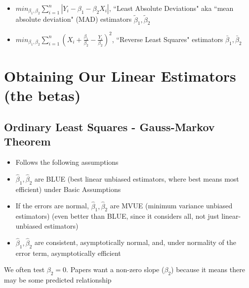 \documentclass[10pt, oneside]{article}
\begin{document}
\begin{itemize}
\begin{itemize}
        \item $min_{\beta_1, \beta_2} \sum ^n _{i=1} |Y_i - \beta_1 -\beta_2 X_i|$, ``Least Absolute Deviations" aka ``mean absolute deviation" (MAD) estimators $\tilde \beta_1, \tilde \beta_2$
        \item $min_{\beta_1, \beta_2} \sum ^n _{i=1} (X_i + \frac{\beta_1}{\beta_2} - \frac{Y_i}{\beta_2})^2$, ``Reverse Least Squares" estimators $\bar \beta_1, \bar \beta_2$
    \end{itemize}
\end{itemize}

\section{Obtaining Our Linear Estimators (the betas)}

\subsection{Ordinary Least Squares - Gauss-Markov Theorem}
\begin{itemize}
    \item Follows the following assumptions
    \item $\hat \beta_1, \hat \beta_2$ are BLUE (best linear unbiased estimators, where best means most efficient) under Basic Assumptions
    \item If the errors are normal, $\hat \beta_1, \hat \beta_2$ are MVUE (minimum variance unbiased estimators) (even better than BLUE, since it considers all, not just linear-unbiased estimators)
    \item $\hat \beta_1, \hat \beta_2$ are consistent, asymptotically normal, and, under normality of the error term, asymptotically efficient
\end{itemize}

We often test $\beta_2 = 0$. Papers want a non-zero slope ($\beta_2$) because it means there may be some predicted relationship
\end{document}
